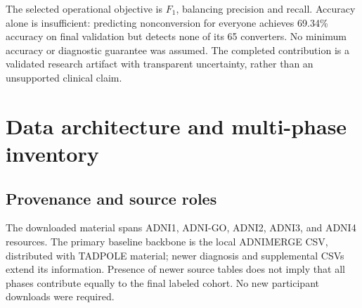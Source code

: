 \documentclass[11pt,a4paper]{article}
\begin{document}
The selected operational objective is $F_1$, balancing precision and recall. Accuracy alone is insufficient: predicting nonconversion for everyone achieves 69.34\% accuracy on final validation but detects none of its 65 converters. No minimum accuracy or diagnostic guarantee was assumed. The completed contribution is a validated research artifact with transparent uncertainty, rather than an unsupported clinical claim.

\clearpage
\section{Data architecture and multi-phase inventory}
\subsection{Provenance and source roles}
The downloaded material spans ADNI1, ADNI-GO, ADNI2, ADNI3, and ADNI4 resources. The primary baseline backbone is the local ADNIMERGE CSV, distributed with TADPOLE material; newer diagnosis and supplemental CSVs extend its information. Presence of newer source tables does not imply that all phases contribute equally to the final labeled cohort. No new participant downloads were required.
\end{document}

